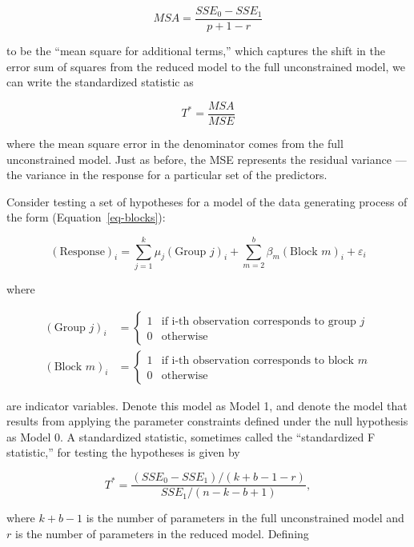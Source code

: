 \documentclass[
  letterpaper,
  DIV=11,
  numbers=noendperiod]{scrreprt}
\providecommand{\tightlist}{%
  \setlength{\itemsep}{0pt}\setlength{\parskip}{0pt}}\usepackage{longtable,booktabs,array}
\theoremstyle{plain}
\theoremstyle{definition}
\theoremstyle{definition}
\theoremstyle{remark}
\begin{document}
\[MSA = \frac{SSE_0 - SSE_1}{p + 1 - r}\]

to be the ``mean square for additional terms,'' which captures the shift
in the error sum of squares from the reduced model to the full
unconstrained model, we can write the standardized statistic as

\[T^* = \frac{MSA}{MSE}\]

where the mean square error in the denominator comes from the full
unconstrained model. Just as before, the MSE represents the residual
variance --- the variance in the response for a particular set of the
predictors.

\begin{description}
\tightlist
\item[Standardized Statistic for Repeated Measures ANOVA
(Definition~\ref{def-blocks-f})]
Consider testing a set of hypotheses for a model of the data generating
process of the form (Equation~\ref{eq-blocks}):
\end{description}

\[(\text{Response})_i = \sum_{j=1}^{k} \mu_j (\text{Group } j)_i + \sum_{m=2}^{b} \beta_m (\text{Block } m)_i + \varepsilon_i\]

where

\[
\begin{aligned}
  (\text{Group } j)_i 
    &= \begin{cases} 1 & \text{if i-th observation corresponds to group } j \\ 0 & \text{otherwise} \end{cases} \\
  (\text{Block } m)_i
    &= \begin{cases} 1 & \text{if i-th observation corresponds to block } m \\ 0 & \text{otherwise} \end{cases}
\end{aligned}
\]

are indicator variables. Denote this model as Model 1, and denote the
model that results from applying the parameter constraints defined under
the null hypothesis as Model 0. A standardized statistic, sometimes
called the ``standardized F statistic,'' for testing the hypotheses is
given by

\[T^* = \frac{\left(SSE_0 - SSE_1\right) / (k + b - 1 - r)}{SSE_1 / (n - k - b + 1)},\]

where \(k + b - 1\) is the number of parameters in the full
unconstrained model and \(r\) is the number of parameters in the reduced
model. Defining
\end{document}
